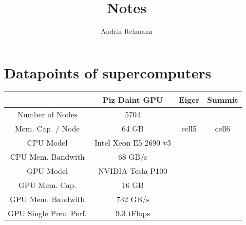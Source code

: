\documentclass[]{article}
\title{Notes}
\author{Andrin Rehmann}
\begin{document}
\maketitle

\section{Datapoints of supercomputers}

\begin{center}
	\begin{tabular}{ c c c c }
		& Piz Daint GPU \cite{piz_daint} & Eiger & Summit \\ 
		\hline
		Number of Nodes & 5704 & & \\
		Mem. Cap. / Node & 64 GB & cell5 & cell6 \\   
		CPU Model & Intel Xeon E5-2690 v3 \\
		CPU Mem. Bandwith  & 68 GB/s \\
		GPU Model & NVIDIA Tesla P100 \\
		GPU Mem. Cap. & 16 GB \\
		GPU Mem. Bandwith & 732 GB/s \\
		GPU Single Prec. Perf. & 9.3 tFlops
	\end{tabular}
\end{center}



\end{document}
